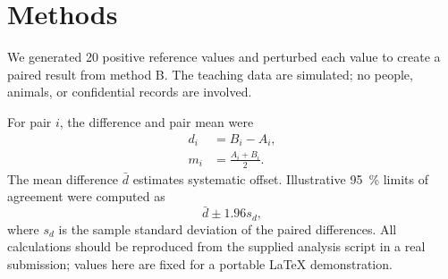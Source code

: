 \section{Methods}
\label{sec:methods}

We generated 20 positive reference values and perturbed each value to create a
paired result from method B. The teaching data are simulated; no people,
animals, or confidential records are involved.

For pair $i$, the difference and pair mean were
\begin{align}
  d_i &= B_i-A_i, \label{eq:difference}\\
  m_i &= \frac{A_i+B_i}{2}. \label{eq:pair-mean}
\end{align}
The mean difference $\bar d$ estimates systematic offset. Illustrative
\SI{95}{\percent} limits of agreement were computed as
\begin{equation}
  \bar d \mathbin{\pm} 1.96s_d,
  \label{eq:limits}
\end{equation}
where $s_d$ is the sample standard deviation of the paired differences. All
calculations should be reproduced from the supplied analysis script in a real
submission; values here are fixed for a portable \LaTeX{} demonstration.
